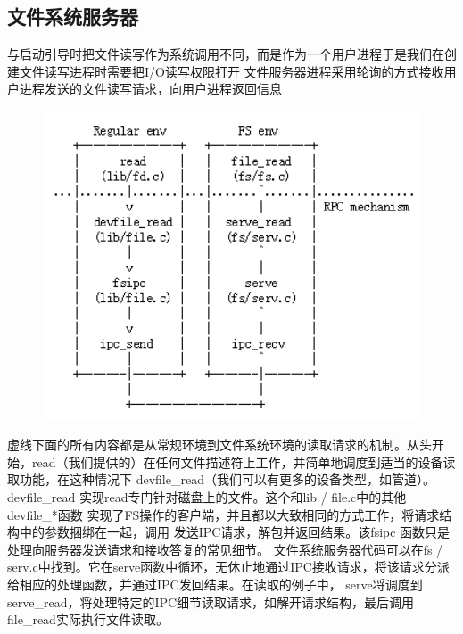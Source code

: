 \documentclass[a4paper,12pt]{report}
\begin{document}
\subsection{	文件系统服务器}
与启动引导时把文件读写作为系统调用不同，而是作为一个用户进程于是我们在创建文件读写进程时需要把I/O读写权限打开
文件服务器进程采用轮询的方式接收用户进程发送的文件读写请求，向用户进程返回信息
\begin{figure}[H]
	\centering
	\includegraphics [width=1.0\textwidth]{figure//image154.png}
\end{figure}


虚线下面的所有内容都是从常规环境到文件系统环境的读取请求的机制。从头开始，read（我们提供的）在任何文件描述符上工作，并简单地调度到适当的设备读取功能，在这种情况下 devfile\_read（我们可以有更多的设备类型，如管道）。 devfile\_read 实现read专门针对磁盘上的文件。这个和lib / file.c中的其他devfile\_*函数 实现了FS操作的客户端，并且都以大致相同的方式工作，将请求结构中的参数捆绑在一起，调用 发送IPC请求，解包并返回结果。该fsipc 函数只是处理向服务器发送请求和接收答复的常见细节。
文件系统服务器代码可以在fs / serv.c中找到。它在serve函数中循环，无休止地通过IPC接收请求，将该请求分派给相应的处理函数，并通过IPC发回结果。在读取的例子中， serve将调度到serve\_read，将处理特定的IPC细节读取请求，如解开请求结构，最后调用 file\_read实际执行文件读取。
\end{document}
